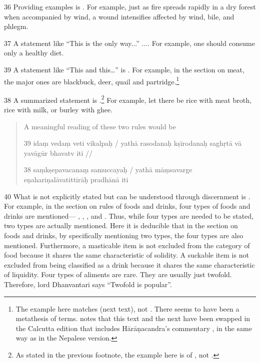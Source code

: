 \begin{translation}
\item [36] Providing examples is . For example, just as fire spreads rapidly in a dry forest when accompanied by wind, a wound intensifies affected by wind, bile, and phlegm.  

\item [37] A statement like “This is the only way...” .... For example, one should consume only a healthy diet.     

\item [39] A statement like “This and this\ldots” is
. For example, in the section on meat, the major ones
are blackbuck, deer, quail and partridge.\footnote{The example here
    matches  (next text), not .  There seems to
    have been a metathesis of terms. \citet[1005, footnote
    6]{susr-trikamji1945} notes that this text and the next have been swapped
    in the Calcutta edition that includes Hārāṇacandra's commentary
    , in the same way as in the Nepalese version.}

\item [38] A summarized statement is
.\footnote{As stated in the previous footnote, the 
example here is of , not .
    } For example, let there be rice
    with meat broth, rice with milk, or burley with ghee.
    
    \begin{quote}
        A meaningful reading of these two rules would be
    
    39 idaṃ vedaṃ veti vikalpaḥ / yathā rasodanaḥ kṣīrodanaḥ saghṛtā vā 
    yavāgūr bhavatv iti //
    
    38 saṃkṣepavacanaṃ samuccayaḥ / yathā māṃsavarge eṇahariṇalāvatittirāḥ 
    pradhānā iti
    \end{quote}
    

\item [40] What is not explicitly stated but can be understood through discernment is . For example, in the section on rules of foods and drinks, four types of foods and drinks are mentioned— , , , and . Thus, while four types are needed to be stated, two types are actually mentioned. Here it is deducible that in the section on foods and drinks, by specifically mentioning two types, the four types are also mentioned. Furthermore, a masticable item is not excluded from the category of food because it shares the same characteristic of solidity. A suckable item is not excluded from being classified as a drink because it shares the same characteristic of liquidity. Four types of aliments are rare. They are usually just twofold. Therefore, lord Dhanvantari says “Twofold is popular”.   


\end{translation}

